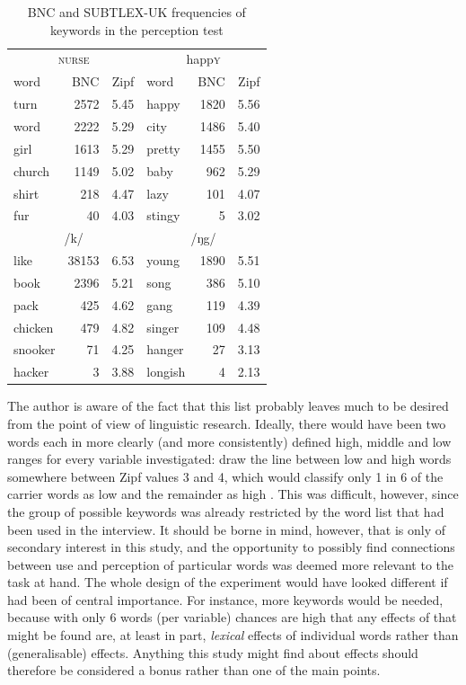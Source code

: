 \begin{table}[h]
	\caption{BNC and SUBTLEX-UK frequencies of keywords in the perception test}
	\label{tab.keywords.frequency}
	\centering
	\begin{tabular}{lrrlrr}
		\hline
		\multicolumn{3}{c}{\textsc{nurse}} & \multicolumn{3}{c}{happ\textsc{y}}\\
		word & BNC & Zipf\is{Zipf score} & word & BNC & Zipf\is{Zipf score} \\
		\hline
		turn & 2572 & 5.45 & happy & 1820 & 5.56 \\
		word & 2222 & 5.29 & city & 1486 & 5.40 \\
		girl & 1613 & 5.29 & pretty & 1455 & 5.50 \\			
		church & 1149 & 5.02 & baby & 962 & 5.29 \\
		shirt & 218 & 4.47 & lazy & 101 & 4.07 \\
		fur & 40 & 4.03 & stingy & 5 & 3.02 \\
		\hline
		\multicolumn{3}{c}{/k/} & \multicolumn{3}{c}{/ŋg/}\\
		\hline
		like & 38153 & 6.53 & young & 1890 & 5.51\\
		book & 2396 & 5.21 & song & 386 & 5.10\\
		pack & 425 & 4.62 & gang & 119 & 4.39\\
		chicken & 479 & 4.82 & singer & 109 & 4.48\\
		snooker & 71 & 4.25 & hanger & 27 & 3.13\\
		hacker & 3 & 3.88 & longish & 4 & 2.13\\
		\hline
	\end{tabular}
\end{table}

The author is aware of the fact that this list probably leaves much to be desired from the point of view of linguistic  research.
Ideally, there would have been two words each in more clearly (and more consistently) defined high, middle and low  ranges for every variable investigated: \textcite{heuvenetal2014} draw the line between low  and high  words somewhere between Zipf values 3 and 4, which would classify only 1 in 6 of the carrier words as low  and the remainder as high .
This was difficult, however, since the group of possible keywords was already restricted by the word list that had been used in the interview.
It should be borne in mind, however, that  is only of secondary interest in this study, and the opportunity to possibly find connections between use and perception of particular words was deemed more relevant to the task at hand.
The whole design of the experiment would have looked different if  had been of central importance.
For instance, more keywords would be needed, because with only 6 words (per variable) chances are high that any effects of  that might be found are, at least in part, \emph{lexical} effects of individual words rather than (generalisable)  effects.
Anything this study might find about  effects should therefore be considered a bonus rather than one of the main points.

